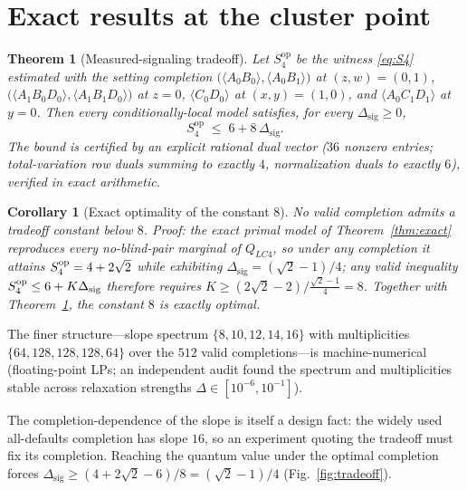 \documentclass[10pt,twocolumn]{article}
\newtheorem{theorem}{Theorem}
\newtheorem{corollary}{Corollary}
\newcommand{\Dsig}{\Delta_{\mathrm{sig}}}
\begin{document}
\section{Exact results at the cluster point}
\label{sec:exact}

\begin{theorem}[Measured-signaling tradeoff]
\label{thm:K8}
Let $S_4^{\mathrm{op}}$ be the witness \eqref{eq:S4} estimated with the setting completion
$\big(\langle A_0B_0\rangle,\langle A_0B_1\rangle\big)$ at $(z,w)=(0,1)$,
$\big(\langle A_1B_0D_0\rangle,\langle A_1B_1D_0\rangle\big)$ at $z=0$,
$\langle C_0D_0\rangle$ at $(x,y)=(1,0)$, and $\langle A_0C_1D_1\rangle$ at $y=0$.
Then every conditionally-local model satisfies, for every $\Dsig\ge0$,
\begin{equation}
S_4^{\mathrm{op}} \;\le\; 6 + 8\,\Dsig .
\end{equation}
The bound is certified by an explicit rational dual vector ($36$ nonzero entries; total-variation row duals summing to exactly $4$, normalization duals to exactly $6$), verified in exact arithmetic.
\end{theorem}

\begin{corollary}[Exact optimality of the constant $8$]
\label{cor:opt}
No valid completion admits a tradeoff constant below $8$. Proof: the exact primal model of Theorem~\ref{thm:exact} reproduces \emph{every} no-blind-pair marginal of $Q_{LC4}$, so under \emph{any} completion it attains $S_4^{\rm op} = 4+2\sqrt2$ while exhibiting $\Dsig = (\sqrt2-1)/4$; any valid inequality $S_4^{\rm op}\le 6+K\Dsig$ therefore requires $K \ge (2\sqrt2-2)\big/\tfrac{\sqrt2-1}{4} = 8$. Together with Theorem~\ref{thm:K8}, the constant $8$ is exactly optimal.
\end{corollary}

The finer structure---slope spectrum $\{8,10,12,14,16\}$ with multiplicities $\{64,128,128,128,64\}$ over the $512$ valid completions---is machine-numerical (floating-point LPs; an independent audit found the spectrum and multiplicities stable across relaxation strengths $\Delta\in[10^{-6},10^{-1}]$).

The completion-dependence of the slope is itself a design fact: the widely used all-defaults completion has slope $16$, so an experiment quoting the tradeoff must fix its completion. Reaching the quantum value under the optimal completion forces $\Dsig \ge (4+2\sqrt2-6)/8 = (\sqrt2-1)/4$ (Fig.~\ref{fig:tradeoff}).
\end{document}
